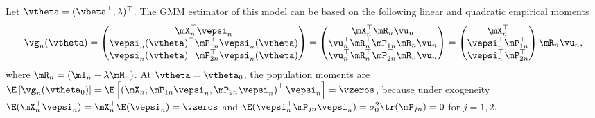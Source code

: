 Let $\vtheta = (\vbeta^\top,\lambda)^\top$. The GMM estimator of this model can be based on the following linear and quadratic empirical moments
\begin{equation*}
 \vg_n(\vtheta) = \begin{pmatrix}
                    \mX_n^\top
                    \vepsi_n \\
                    \vepsi_n(\vtheta)^\top\mP_{1n}^\top\vepsi_n(\vtheta) \\
                    \vepsi_n(\vtheta)^\top\mP_{2n}^\top\vepsi_n(\vtheta)
                  \end{pmatrix}
                  =
                  \begin{pmatrix}
                   \mX_n^\top\mR_n\vu_n  \\
                    \vu_n^\top\mR_n^\top \mP_{1n}^\top\mR_n\vu_n \\
                    \vu_n^\top\mR_n^\top \mP_{2n}^\top\mR_n\vu_n
                  \end{pmatrix}
                  = \begin{pmatrix}
    \mX_n^\top \\
    \vepsi_n^\top\mP_{1n}^\top \\
    \vepsi_n^\top\mP_{2n}^\top
\end{pmatrix} 
\mR_n\vu_n, 
\end{equation*}
%
where $\mR_n = (\mI_n - \lambda \mM_n)$. At $\vtheta = \vtheta_0$, the population moments are $\E\left[\vg_n(\vtheta_0)\right] = \E\left[\left(\mX_n, \mP_{1n}\vepsi_n, \mP_{2n}\vepsi_n\right)^\top\vepsi_n\right] = \vzeros$, because under exogeneity $\E(\mX_n^\top\vepsi_n) = \mX_n^\top\E(\vepsi_n) = \vzeros$ and $\E(\vepsi_n^\top\mP_{jn}\vepsi_n) = \sigma_0^2\tr(\mP_{jn}) = 0$ for $j = 1, 2$. 

